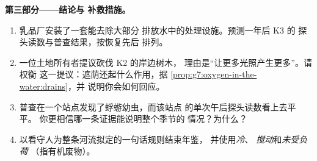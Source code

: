 \begin{problem}
\medskip\noindent\textbf{第三部分——结论与
补救措施。}
\begin{enumerate}[resume]
  \item 乳品厂安装了一套能去除大部分
        排放水中的处理设施。预测一年后 K3 的
        探头读数与普查结果，按恢复先后
        排列。
  \item 一位土地所有者提议砍伐 K2 的岸边树木，
        理由是“让更多光照产生更多”。请权衡
        这一提议：遮荫还起什么作用，据
        \cref{prop:g7:oxygen-in-the-water:drains}，并
        说明你会如何回应。
  \item 普查在一个站点发现了蜉蝣幼虫，而该站点
        的单次午后探头读数看上去平平。
        你更相信哪一条证据能说明整个季节的
        情况？为什么？
  \item 以看守人为整条河流拟定的一句话规则结束年鉴，
        并使用\emph{冷}、
        \emph{搅动}和\emph{未受负荷}
        （指有机废物）。
\end{enumerate}
\end{problem}
